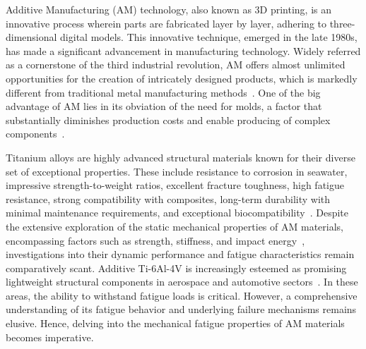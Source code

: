 \documentclass[preprint,12pt]{elsarticle}
\begin{document}
Additive Manufacturing (AM) technology, also known as 3D printing, is an innovative process wherein parts are fabricated layer by layer, adhering to three-dimensional digital models. This innovative technique, emerged in the late 1980s, has made a significant advancement in manufacturing technology. Widely referred as a cornerstone of the third industrial revolution, AM offers almost unlimited opportunities for the creation of intricately designed products, which is markedly different from traditional metal manufacturing methods~\cite{wong2012review}. One of the big advantage of AM lies in its obviation of the need for molds, a factor that substantially diminishes production costs and enable producing of complex components~\cite{herzog2016additive}.


Titanium alloys are highly advanced structural materials known for their diverse set of exceptional properties. These include resistance to corrosion in seawater, impressive strength-to-weight ratios, excellent fracture toughness, high fatigue resistance, strong compatibility with composites, long-term durability with minimal maintenance requirements, and exceptional biocompatibility~\cite{qian2016additive}. Despite the extensive exploration of the static mechanical properties of AM materials, encompassing factors such as strength, stiffness, and impact energy~\cite{debroy2018additive,gorsse2017additive}, investigations into their dynamic performance and fatigue characteristics remain comparatively scant. Additive Ti-6Al-4V is increasingly esteemed as promising lightweight structural components in aerospace and automotive sectors~\cite{boyer1996overview,debroy2018additive}. In these areas, the ability to withstand fatigue loads is critical. However, a comprehensive understanding of its fatigue behavior and underlying failure mechanisms remains elusive. Hence, delving into the mechanical fatigue properties of AM materials becomes imperative.
\end{document}
